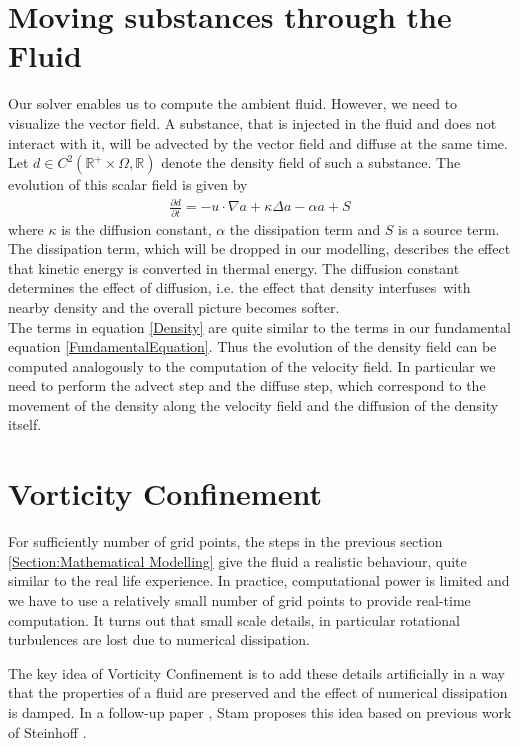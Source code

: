 \documentclass[a4paper,10pt,oneside,final,german,openbib,pdftex,titlepage]{scrbook}
\begin{document}
\section{Moving substances through the Fluid}
Our solver enables us to compute the ambient fluid. However, we need to visualize the vector field. A substance, that is injected in the fluid and does not interact with it, will be advected by the vector field and diffuse at the same time. Let $d \in C^2(\mathbb{R}^+\times\Omega, \mathbb{R})$ denote the density field of such a substance. The evolution of this scalar field is given by
\begin{align}
	\frac{\partial d}{\partial t} = - u \cdot \nabla a + \kappa \Delta a - \alpha  a + S \label{Density}
\end{align}
where $\kappa$ is the diffusion constant, $\alpha$ the dissipation term and $S$ is a source term. The dissipation term, which will be dropped in our modelling, describes the effect that kinetic energy is converted in thermal energy. The diffusion constant determines the effect of diffusion, i.e. the effect that density \glqq interfuses\grqq ~with nearby density and the overall picture becomes \glqq  softer\grqq .\\

The terms in equation \ref{Density} are quite similar to the terms in our fundamental equation \ref{FundamentalEquation}. Thus the evolution of the density field can be computed analogously to the computation of the velocity field. In particular we need to perform the advect step and the diffuse step, which correspond to the movement of the density along the velocity field and the diffusion of the density itself.

\section{Vorticity Confinement}
For sufficiently number of grid points, the steps in the previous section \ref{Section:Mathematical Modelling} give the fluid a realistic behaviour, quite similar to the real life experience. In practice, computational power is limited and we have to use a relatively small number of grid points to provide real-time computation. It turns out that small scale details, in particular rotational turbulences are lost due to numerical dissipation.

The key idea of Vorticity Confinement is to add these details artificially in a way that the properties of a fluid are preserved and the effect of numerical dissipation is damped. In a follow-up paper \cite{Stam2}, Stam proposes this idea based on previous work of Steinhoff \cite{Steinhoff}.\\
\end{document}
